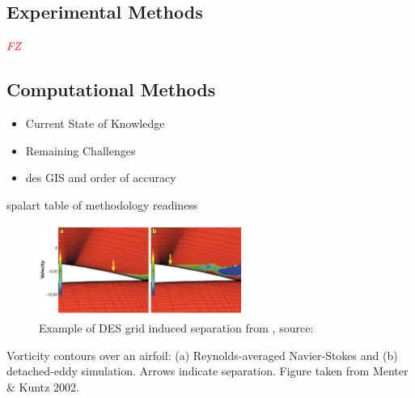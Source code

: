 \documentclass[journal]{new-aiaa}
\begin{document}
\subsection{Experimental Methods} \label{subsec:currentstateexperimental}

\textcolor{red}{\emph{FZ}}


\subsection{Computational Methods} \label{subsec:currentstatecomputational}



\begin{itemize}
    \item Current State of Knowledge
    \item Remaining Challenges
    \item des GIS and order of accuracy
\end{itemize}



spalart table of methodology readiness




\begin{figure}[H]
\begin{center}
\includegraphics[width=0.6\textwidth]{Images/logan/spalart2009detachededdy_GridInducedSeparation.pdf}
\caption{ Example of DES grid induced separation from \cite{spalart2009detachededdy}, source: \cite{menter2004adaptation} }
\label{fig:desgridinducedseparation}
\end{center}
\end{figure}

Vorticity contours over an airfoil: (a) Reynolds-averaged Navier-Stokes and (b) detached-eddy simulation.
Arrows indicate separation. Figure taken from Menter \& Kuntz 2002.
\end{document}
